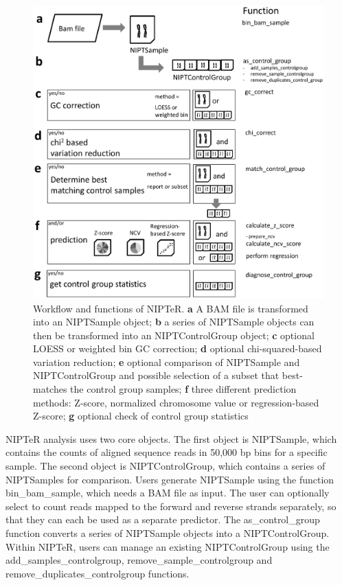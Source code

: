 \begin{figure}
	\includegraphics[width=1.0\linewidth]{img/NIPTeR_Fig1}
	\caption[Workflow and functions of NIPTeR]{Workflow and functions of NIPTeR. \textbf{a} A BAM file is transformed into an NIPTSample object; \textbf{b} a series of NIPTSample objects can then be transformed into an NIPTControlGroup object; \textbf{c} optional LOESS or weighted bin GC correction; \textbf{d} optional chi-squared-based variation reduction; \textbf{e} optional comparison of NIPTSample and NIPTControlGroup and possible selection of a subset that best-matches the control group samples; \textbf{f} three different prediction methods: Z-score, normalized chromosome value or regression-based Z-score; \textbf{g} optional check of control group statistics}
	\label{fig:Algorithms_NIPT_Fig1}
\end{figure}

NIPTeR analysis uses two core objects. 
The first object is NIPTSample, which contains the counts of aligned sequence reads in 50,000 bp bins for a specific sample. 
The second object is NIPTControlGroup, which contains a series of NIPTSamples for comparison. Users generate NIPTSample using the function bin\_bam\_sample, which needs a BAM file \cite{Li_2009} as input. 
The user can optionally select to count reads mapped to the forward and reverse strands separately, so that they can each be used as a separate predictor. 
The as\_control\_group function converts a series of NIPTSample objects into a NIPTControlGroup. 
Within NIPTeR, users can manage an existing NIPTControlGroup using the add\_samples\_controlgroup, remove\_sample\_controlgroup and remove\_duplicates\_controlgroup functions.

